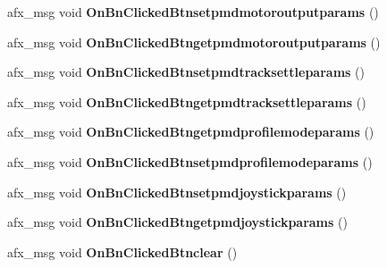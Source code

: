 \begin{DoxyCompactItemize}
\item 
afx\+\_\+msg void {\bfseries On\+Bn\+Clicked\+Btnsetpmdmotoroutputparams} ()\hypertarget{class_c_a_p_t_d_l_l_client_dlg_acce6a0da5a55a24ec532a73b19ef972c}{}\label{class_c_a_p_t_d_l_l_client_dlg_acce6a0da5a55a24ec532a73b19ef972c}

\item 
afx\+\_\+msg void {\bfseries On\+Bn\+Clicked\+Btngetpmdmotoroutputparams} ()\hypertarget{class_c_a_p_t_d_l_l_client_dlg_a623a1a26d5cf99416ba26bb8c02c318b}{}\label{class_c_a_p_t_d_l_l_client_dlg_a623a1a26d5cf99416ba26bb8c02c318b}

\item 
afx\+\_\+msg void {\bfseries On\+Bn\+Clicked\+Btnsetpmdtracksettleparams} ()\hypertarget{class_c_a_p_t_d_l_l_client_dlg_a9bd360d6926d98142fd6596c44824faa}{}\label{class_c_a_p_t_d_l_l_client_dlg_a9bd360d6926d98142fd6596c44824faa}

\item 
afx\+\_\+msg void {\bfseries On\+Bn\+Clicked\+Btngetpmdtracksettleparams} ()\hypertarget{class_c_a_p_t_d_l_l_client_dlg_a65eeb0f931bcd1129e13f4305e0494cd}{}\label{class_c_a_p_t_d_l_l_client_dlg_a65eeb0f931bcd1129e13f4305e0494cd}

\item 
afx\+\_\+msg void {\bfseries On\+Bn\+Clicked\+Btngetpmdprofilemodeparams} ()\hypertarget{class_c_a_p_t_d_l_l_client_dlg_afa02a41b6192f651e65dacb32d9435ac}{}\label{class_c_a_p_t_d_l_l_client_dlg_afa02a41b6192f651e65dacb32d9435ac}

\item 
afx\+\_\+msg void {\bfseries On\+Bn\+Clicked\+Btnsetpmdprofilemodeparams} ()\hypertarget{class_c_a_p_t_d_l_l_client_dlg_abb8985d62e7d60fcd462f3bdfb58a1e4}{}\label{class_c_a_p_t_d_l_l_client_dlg_abb8985d62e7d60fcd462f3bdfb58a1e4}

\item 
afx\+\_\+msg void {\bfseries On\+Bn\+Clicked\+Btnsetpmdjoystickparams} ()\hypertarget{class_c_a_p_t_d_l_l_client_dlg_a936468ce08e10d854da84d7fefe7c464}{}\label{class_c_a_p_t_d_l_l_client_dlg_a936468ce08e10d854da84d7fefe7c464}

\item 
afx\+\_\+msg void {\bfseries On\+Bn\+Clicked\+Btngetpmdjoystickparams} ()\hypertarget{class_c_a_p_t_d_l_l_client_dlg_add782a6019fadde6251119f6eca650a8}{}\label{class_c_a_p_t_d_l_l_client_dlg_add782a6019fadde6251119f6eca650a8}

\item 
afx\+\_\+msg void {\bfseries On\+Bn\+Clicked\+Btnclear} ()\hypertarget{class_c_a_p_t_d_l_l_client_dlg_a5eebaad8fa490c8687306939a9fba138}{}\label{class_c_a_p_t_d_l_l_client_dlg_a5eebaad8fa490c8687306939a9fba138}


\end{DoxyCompactItemize}
